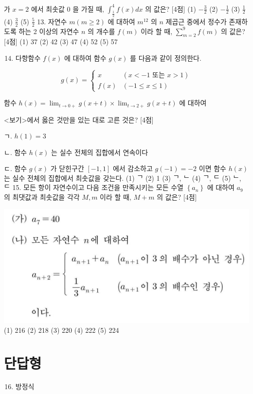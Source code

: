 \documentclass[10pt]{article}
\begin{document}
가 $x=2$ 에서 최솟값 0 을 가질 때, $\int_{\frac{1}{2}}^{4} f(x) d x$ 의 값은? [4점]
(1) $-\frac{3}{2}$
(2) $-\frac{1}{2}$
(3) $\frac{1}{2}$
(4) $\frac{3}{2}$
(5) $\frac{5}{2}$ 13. 자연수 $m(m \geq 2)$ 에 대하여 $m^{12}$ 의 $n$ 제곱근 중에서 정수가 존재하도록 하는 2 이상의 자연수 $n$ 의 개수를 $f(m)$ 이라 할 때, $\sum_{m=2}^{9} f(m)$ 의 값은? [4점]
(1) 37
(2) 42
(3) 47
(4) 52
(5) 57

\begin{enumerate}
  \setcounter{enumi}{13}
  \item 다항함수 $f(x)$ 에 대하여 함수 $g(x)$ 를 다음과 같이 정의한다.
\end{enumerate}

$$
g(x)= \begin{cases}x & (x<-1 \text { 또는 } x>1) \\ f(x) & (-1 \leq x \leq 1)\end{cases}
$$

함수 $h(x)=\lim _{t \rightarrow 0+} g(x+t) \times \lim _{t \rightarrow 2+} g(x+t)$ 에 대하여

<보기>에서 옳은 것만을 있는 대로 고른 것은? [4점]

ㄱ. $h(1)=3$

ㄴ. 함수 $h(x)$ 는 실수 전체의 집합에서 연속이다

ㄷ. 함수 $g(x)$ 가 닫힌구간 $[-1,1]$ 에서 감소하고 $g(-1)=-2$ 이면 함수 $h(x)$ 는 실수 전체의 집합에서 최솟값을 갖는다.
(1) ᄀ
(2) 1
(3) ᄀ, ᄂ (4) ᄀ, ᄃ
(5) ᄂ, ᄃ 15. 모든 항이 자연수이고 다음 조건을 만족시키는 모든 수열 $\left\{a_{n}\right\}$ 에 대하여 $a_{9}$ 의 최댓값과 최솟값을 각각 $M, m$ 이라 할 때, $M+m$ 의 값은? [4점]

\includegraphics[max width=\textwidth, center]{2023_05_19_a9cef858603f6abf5411g-06}
(1) 216
(2) 218
(3) 220
(4) 222
(5) 224

\section{단답형}
\begin{enumerate}
  \setcounter{enumi}{15}
  \item 방정식
\end{enumerate}
\end{document}

